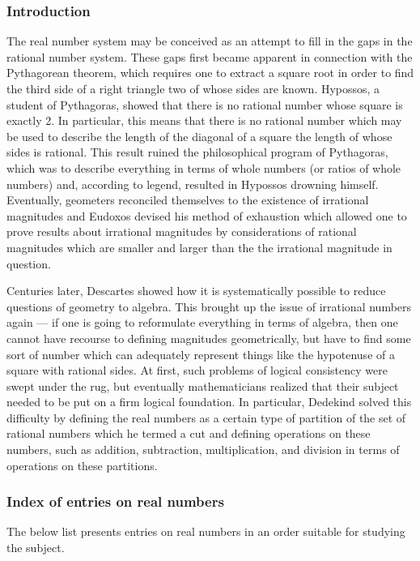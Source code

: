 \documentclass[12pt]{article}
\begin{document}
\subsubsection*{Introduction}
The real number system may be conceived as an attempt to fill in the
gaps in the rational number system.  These gaps first became apparent
in connection with the Pythagorean theorem, which requires one to extract
a square root in order to find the third side of a right triangle two of
whose sides are known.  Hypossos, a student of Pythagoras, showed that there
is no rational number whose square is exactly 2.  In particular, this means
that there is no rational number which may be used to describe the length
of the diagonal of a square the length of whose sides is rational.  This
result ruined the philosophical program of Pythagoras, which was to describe
everything in terms of whole numbers (or ratios of whole numbers) and, 
according to legend, resulted in Hypossos drowning himself.  Eventually,
geometers reconciled themselves to the existence of irrational magnitudes
and Eudoxos devised his method of exhaustion which allowed one to prove
results about irrational magnitudes by considerations of rational magnitudes
which are smaller and larger than the the irrational magnitude in question.

Centuries later, Descartes showed how it is systematically possible to
reduce questions of geometry to algebra.  This brought up the issue of
irrational numbers again --- if one is going to reformulate everything
in terms of algebra, then one cannot have recourse to defining magnitudes
geometrically, but have to find some sort of number which can adequately 
represent things like the hypotenuse of a square with rational sides.
At first, such problems of logical consistency were swept under the rug,
but eventually mathematicians realized that their subject needed to be
put on a firm logical foundation.  In particular, Dedekind solved this 
difficulty by defining the real numbers as a certain type of partition of
the set of rational numbers which he termed a cut and defining operations
on these numbers, such as addition, subtraction, multiplication, and division
in terms of operations on these partitions.

\subsubsection*{Index of entries on real numbers}
The below list presents entries on real numbers in an order 
suitable for studying the subject. 
\end{document}
